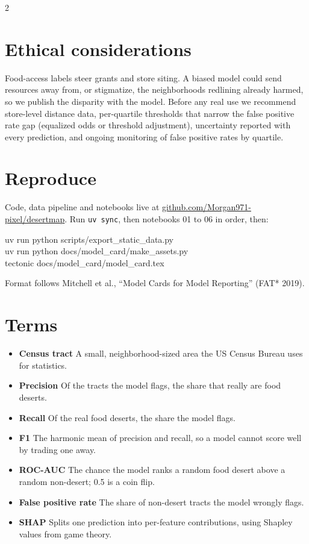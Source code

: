 \documentclass[10pt,letterpaper]{article}
\newcommand{\lbl}[1]{\textbf{#1}\enspace}
\begin{document}
\begin{multicols}{2}
\section*{Ethical considerations}
Food-access labels steer grants and store siting. A biased model could send resources away from, or stigmatize, the neighborhoods redlining already harmed, so we publish the disparity with the model. Before any real use we recommend store-level distance data, per-quartile thresholds that narrow the false positive rate gap (equalized odds or threshold adjustment), uncertainty reported with every prediction, and ongoing monitoring of false positive rates by quartile.

\section*{Reproduce}
{\raggedright Code, data pipeline and notebooks live at \href{https://github.com/Morgan971-pixel/desertmap}{github.com/\allowbreak Morgan971-pixel/\allowbreak desertmap}. Run \texttt{uv sync}, then notebooks 01 to 06 in order, then:\par}
\vspace{1pt}
{\footnotesize\ttfamily uv run python scripts/export\_static\_data.py\\
uv run python docs/model\_card/make\_assets.py\\
tectonic docs/model\_card/model\_card.tex}\par
\vspace{2pt}
{\footnotesize\color{muted}Format follows Mitchell et al., ``Model Cards for Model Reporting'' (FAT* 2019).}

\section*{Terms}
\begin{itemize}
  \item \lbl{Census tract} A small, neighborhood-sized area the US Census Bureau uses for statistics.
  \item \lbl{Precision} Of the tracts the model flags, the share that really are food deserts.
  \item \lbl{Recall} Of the real food deserts, the share the model flags.
  \item \lbl{F1} The harmonic mean of precision and recall, so a model cannot score well by trading one away.
  \item \lbl{ROC-AUC} The chance the model ranks a random food desert above a random non-desert; 0.5 is a coin flip.
  \item \lbl{False positive rate} The share of non-desert tracts the model wrongly flags.
  \item \lbl{SHAP} Splits one prediction into per-feature contributions, using Shapley values from game theory.
\end{itemize}

\end{multicols}
\end{document}

